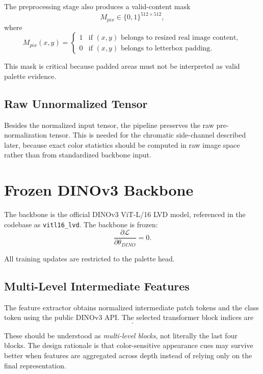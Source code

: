 \documentclass[11pt,a4paper]{article}
\begin{document}
The preprocessing stage also produces a valid-content mask
\begin{equation}
M_{pix} \in \{0,1\}^{512 \times 512},
\end{equation}
where
\begin{equation}
M_{pix}(x,y)=
\begin{cases}
1 & \text{if } (x,y) \text{ belongs to resized real image content},\\
0 & \text{if } (x,y) \text{ belongs to letterbox padding}.
\end{cases}
\end{equation}

This mask is critical because padded areas must not be interpreted as valid palette evidence.

\subsection{Raw Unnormalized Tensor}

Besides the normalized input tensor, the pipeline preserves the raw pre-normalization tensor. This is needed for the chromatic side-channel described later, because exact color statistics should be computed in raw image space rather than from standardized backbone input.

\section{Frozen DINOv3 Backbone}

The backbone is the official DINOv3 ViT-L/16 LVD model, referenced in the codebase as \texttt{vitl16\_lvd}. The backbone is frozen:
\begin{equation}
\frac{\partial \mathcal{L}}{\partial \theta_{DINO}} = 0.
\end{equation}

All training updates are restricted to the palette head.

\subsection{Multi-Level Intermediate Features}

The feature extractor obtains normalized intermediate patch tokens and the class token using the public DINOv3 API. The selected transformer block indices are
\begin{equation}
[5, 11, 17, 23].
\end{equation}

These should be understood as \emph{multi-level blocks}, not literally the last four blocks. The design rationale is that color-sensitive appearance cues may survive better when features are aggregated across depth instead of relying only on the final representation.
\end{document}
